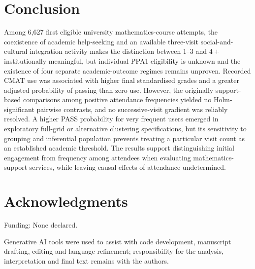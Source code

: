 \section{Conclusion}

Among 6,627 first eligible university mathematics-course attempts, the coexistence of academic help-seeking and an available three-visit social-and-cultural integration activity makes the distinction between $1$--$3$ and $4+$ institutionally meaningful, but individual PPA1 eligibility is unknown and the existence of four separate academic-outcome regimes remains unproven. Recorded CMAT use was associated with higher final standardised grades and a greater adjusted probability of passing than zero use. However, the originally support-based comparisons among positive attendance frequencies yielded no Holm-significant pairwise contrasts, and no successive-visit gradient was reliably resolved. A higher PASS probability for very frequent users emerged in exploratory full-grid or alternative clustering specifications, but its sensitivity to grouping and inferential population prevents treating a particular visit count as an established academic threshold. The results support distinguishing initial engagement from frequency among attendees when evaluating mathematics-support services, while leaving causal effects of attendance undetermined.

\section*{Acknowledgments}

Funding: None declared.

Generative AI tools were used to assist with code development, manuscript drafting, editing and language refinement; responsibility for the analysis, interpretation and final text remains with the authors.






